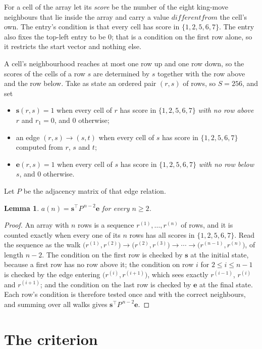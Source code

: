 \documentclass[11pt,a4paper]{article}
\theoremstyle{plain}
\newtheorem{lemma}[theorem]{Lemma}
\theoremstyle{definition}
\begin{document}
For a cell of the array let its \emph{score} be the number of the eight king-move neighbours that lie inside
the array and carry a value $different from$ the cell's own. The entry's condition is that every cell
has score in $\{1,2,5,6,7\}$. The entry also fixes the top-left entry to be $0$; that is a condition on the first row alone, so it restricts the start vector and nothing else.

A cell's neighbourhood reaches at most one row up and one row down, so the scores of the
cells of a row $s$ are determined by $s$ together with the row above and the row below.
Take as state an ordered pair $(r,s)$ of rows, so $S=256$, and set
\begin{itemize}
\item $\mathbf{s}(r,s)=1$ when every cell of $r$ has score in $\{1,2,5,6,7\}$ \emph{with no row
above $r$} and $r_1=0$, and $0$ otherwise;
\item an edge $(r,s)\to(s,t)$ when every cell of $s$ has score in $\{1,2,5,6,7\}$ computed from
$r$, $s$ and $t$;
\item $\mathbf{e}(r,s)=1$ when every cell of $s$ has score in $\{1,2,5,6,7\}$ \emph{with no row
below $s$}, and $0$ otherwise.
\end{itemize}
Let $P$ be the adjacency matrix of that edge relation.

\begin{lemma}\label{lem:walk}
$a(n)=\mathbf{s}^{\!\top}P^{\,n-2}\mathbf{e}$ for every $n\ge2$.
\end{lemma}

\begin{proof}
An array with $n$ rows is a sequence $r^{(1)},\dots,r^{(n)}$ of rows, and it is counted
exactly when every one of its $n$ rows has all scores in $\{1,2,5,6,7\}$. Read the sequence as the
walk $\bigl(r^{(1)},r^{(2)}\bigr)\to\bigl(r^{(2)},r^{(3)}\bigr)\to\cdots\to
\bigl(r^{(n-1)},r^{(n)}\bigr)$, of length $n-2$. The condition on the first row is
checked by $\mathbf{s}$ at the initial state, because a first row has no row above it; the
condition on row $i$ for $2\le i\le n-1$ is checked by the edge entering
$\bigl(r^{(i)},r^{(i+1)}\bigr)$, which sees exactly $r^{(i-1)}$, $r^{(i)}$ and
$r^{(i+1)}$; and the condition on the last row is checked by $\mathbf{e}$ at the final
state. Each row's condition is therefore tested once and with the correct neighbours, and
summing over all walks gives $\mathbf{s}^{\!\top}P^{\,n-2}\mathbf{e}$.
\end{proof}

\section{The criterion}
\end{document}
